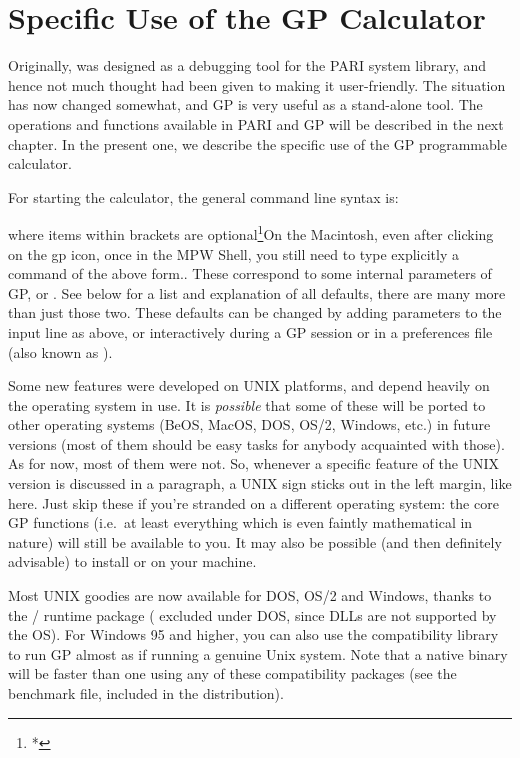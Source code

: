 %
%
\chapter{Specific Use of the GP Calculator}

Originally,  was designed as a debugging tool for the PARI system
library, and hence not much thought had been given to making it
user-friendly. The situation has now changed somewhat, and GP is very
useful as a stand-alone tool. The operations and functions available in
PARI and GP will be described in the next chapter. In the present one, we
describe the specific use of the GP programmable calculator.

For starting the calculator, the general command line syntax is:


\noindent
where items within brackets are optional\footnote{*}{On the Macintosh, even
after clicking on the gp icon, once in the MPW Shell, you still need to type
explicitly a command of the above form.}. These correspond to some internal
parameters of GP, or . See  below for a
list and explanation of all defaults, there are many more than just those
two. These defaults can be changed by adding parameters to the input line
as above, or interactively during a GP session or in a preferences file (also
known as ).

\unix Some new features were developed on UNIX platforms, and depend heavily
on the operating system in use. It is \emph{possible} that some of these
will be ported to other operating systems (BeOS, MacOS, DOS, OS/2, Windows,
etc.) in future versions (most of them should be easy tasks for anybody
acquainted with those). As for now, most of them were not. So, whenever a
specific feature of the UNIX version is discussed in a paragraph, a UNIX sign
sticks out in the left margin, like here. Just skip these if you're stranded
on a different operating system: the core GP functions (i.e.~at least
everything which is even faintly mathematical in nature) will still be
available to you. It may also be possible (and then definitely advisable) to
install  or  on your machine.

 Most UNIX goodies are now
available for DOS, OS/2 and Windows, thanks to the /
runtime package ( excluded under DOS, since DLLs are not
supported by the OS). For Windows 95 and higher, you can also use the
 compatibility library to run GP almost as if running a genuine
Unix system. Note that a native  binary will be faster than one
using any of these compatibility packages (see the  benchmark
file, included in the distribution).

